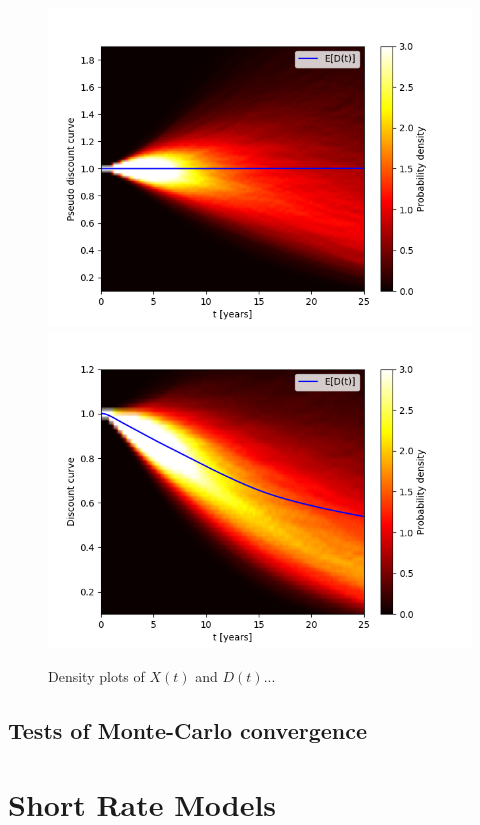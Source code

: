 \documentclass{report}
\begin{document}
\begin{figure}
\centering
\includegraphics[scale=0.7]{figures/pseudo_discount_density.png}
\includegraphics[scale=0.7]{figures/discount_density.png}
\caption{Density plots of $X(t)$ and $D(t)$...}
\end{figure}

\section{Tests of Monte-Carlo convergence}

\appendix

\chapter{Short Rate Models}
\end{document}
